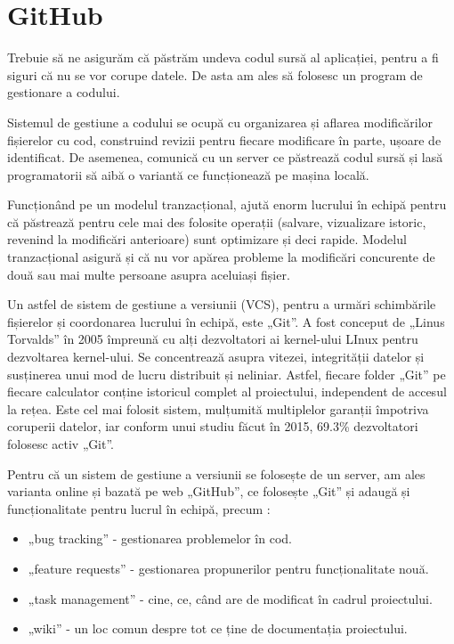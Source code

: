 \section{GitHub}
	Trebuie să ne asigurăm că păstrăm undeva codul sursă al aplicației, pentru a fi siguri că nu se vor corupe datele.
	De asta am ales să folosesc un program de gestionare a codului.\cite{mercurial}

	Sistemul de gestiune a codului se ocupă cu organizarea și aflarea modificărilor fișierelor cu cod, construind revizii pentru fiecare modificare în parte, ușoare de identificat.
	De asemenea, comunică cu un server ce păstrează codul sursă și lasă programatorii să aibă o variantă ce funcționează pe mașina locală.

	Funcționând pe un modelul tranzacțional, ajută enorm lucrului în echipă pentru că păstrează pentru cele mai des folosite operații (salvare, vizualizare istoric, revenind la modificări anterioare) sunt optimizare și deci rapide.
	Modelul tranzacțional asigură și că nu vor apărea probleme la modificări concurente de două sau mai multe persoane asupra aceluiași fișier.

	Un astfel de sistem de gestiune a versiunii (VCS), pentru a urmări schimbările fișierelor și coordonarea lucrului în echipă, este „Git”.\cite{git}
	A fost conceput de „Linus Torvalds” în 2005 împreună cu alți dezvoltatori ai kernel-ului LInux pentru dezvoltarea kernel-ului.
	Se concentrează asupra vitezei, integrității datelor și susținerea unui mod de lucru distribuit și neliniar.
	Astfel, fiecare folder „Git” pe fiecare calculator conține istoricul complet al proiectului, independent de accesul la rețea.
	Este cel mai folosit sistem, mulțumită multiplelor garanții împotriva coruperii datelor, iar conform unui studiu făcut în 2015, 69.3\% dezvoltatori folosesc activ „Git”.

	Pentru că un sistem de gestiune a versiunii se folosește de un server, am ales varianta online și bazată pe web „GitHub”, ce folosește „Git” și adaugă și funcționalitate pentru lucrul în echipă, precum \cite{github} :
	\begin{itemize}
		\item „bug tracking” - gestionarea problemelor în cod.
		\item „feature requests” - gestionarea propunerilor pentru funcționalitate nouă.
		\item „task management” - cine, ce, când are de modificat în cadrul proiectului.
		\item „wiki” - un loc comun despre tot ce ține de documentația proiectului.
	\end{itemize}

